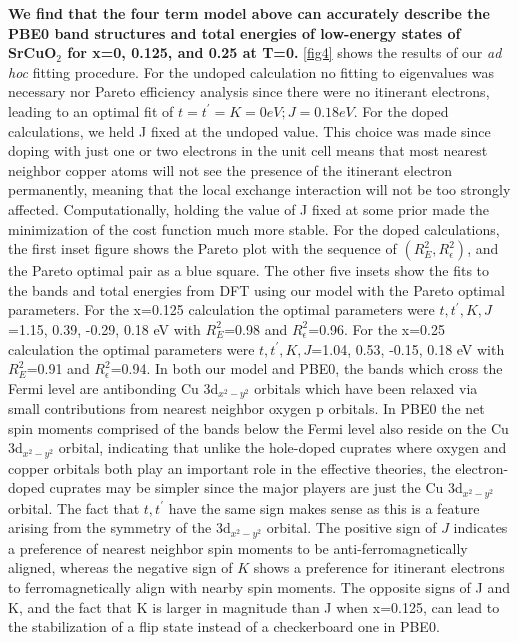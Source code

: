 \documentclass{article}
\begin{document}
\textbf{We find that the four term model above can accurately describe the PBE0 band structures and total energies of low-energy states of SrCuO$_2$ for x=0, 0.125, and 0.25 at T=0.}
\ref{fig4} shows the results of our \textit{ad hoc} fitting procedure. For the undoped calculation no fitting to eigenvalues was necessary nor Pareto efficiency analysis since there were no itinerant electrons, leading to an optimal fit of $t=t^\prime=K=0 eV; J = 0.18 eV$. 
For the doped calculations, we held J fixed at the undoped value. 
This choice was made since doping with just one or two electrons in the unit cell means that most nearest neighbor copper atoms will not see the presence of the itinerant electron permanently, meaning that the local exchange interaction will not be too strongly affected.
Computationally, holding the value of J fixed at some prior made the minimization of the cost function much more stable. 
For the doped calculations, the first inset figure shows the Pareto plot with the sequence of $(R^2_E, R^2_\epsilon)$, and the Pareto optimal pair as a blue square. 
The other five insets show the fits to the bands and total energies from DFT using our model with the Pareto optimal parameters. 
For the x=0.125 calculation the optimal parameters were $t,t^\prime,K,J$=1.15, 0.39, -0.29, 0.18 eV with $R^2_E$=0.98 and $R^2_\epsilon$=0.96. 
For the x=0.25 calculation the optimal parameters were $t,t^\prime,K,J$=1.04, 0.53, -0.15, 0.18 eV with $R^2_E$=0.91 and $R^2_\epsilon$=0.94. 
In both our model and PBE0, the bands which cross the Fermi level are antibonding Cu 3d$_{x^2-y^2}$ orbitals which have been relaxed via small contributions from nearest neighbor oxygen p orbitals. 
In PBE0 the net spin moments comprised of the bands below the Fermi level also reside on the Cu 3d$_{x^2-y^2}$ orbital, indicating that unlike the hole-doped cuprates where oxygen and copper orbitals both play an important role in the effective theories, the electron-doped cuprates may be simpler since the major players are just the Cu 3d$_{x^2-y^2}$ orbital. 
The fact that $t, t^\prime$ have the same sign makes sense as this is a feature arising from the symmetry of the 3d$_{x^2-y^2}$ orbital. 
The positive sign of $J$ indicates a preference of nearest neighbor spin moments to be anti-ferromagnetically aligned, whereas the negative sign of $K$ shows a preference for itinerant electrons to ferromagnetically align with nearby spin moments. 
The opposite signs of J and K, and the fact that K is larger in magnitude than J when x=0.125, can lead to the stabilization of a flip state instead of a checkerboard one in PBE0. 
\end{document}
